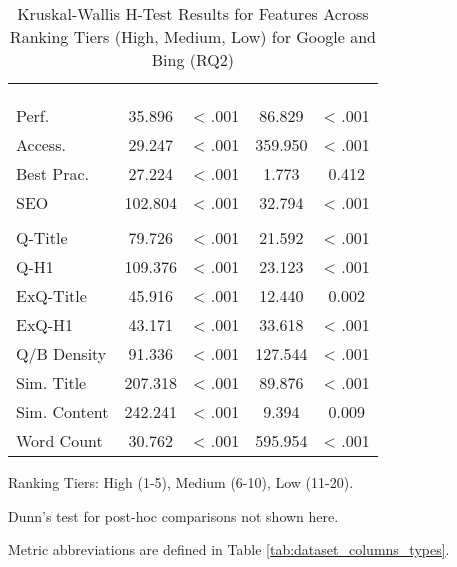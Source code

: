 \begin{table}[htbp!]
\centering
\caption{Kruskal-Wallis H-Test Results for Features Across Ranking Tiers (High, Medium, Low) for Google and Bing (RQ2)}
\label{tab:rq2_kruskal_wallis_ranks}
\small
\setlength{\tabcolsep}{3pt}
\renewcommand{\arraystretch}{1}
\begin{threeparttable}
\begin{tabular*}{\textwidth}{l@{\extracolsep{\fill}}S[table-format=3.3] S[table-format=1.3,table-comparator=true] S[table-format=3.3] S[table-format=1.3,table-comparator=true]}
\toprule
&  &  \\
\cmidrule(lr){2-3} \cmidrule(lr){4-5}
 & {} & {} & {} & {} \\
\dmidrule
{} & & & & \\
Perf. & 35.896 & < .001 & 86.829 & < .001 \\
Access. & 29.247 & < .001 & 359.950 & < .001 \\
Best Prac. & 27.224 & < .001 & 1.773 & 0.412 \\
SEO & 102.804 & < .001 & 32.794 & < .001 \\
\midrule
{} & & & & \\
Q-Title & 79.726 & < .001 & 21.592 & < .001 \\
Q-H1 & 109.376 & < .001 & 23.123 & < .001 \\
ExQ-Title & 45.916 & < .001 & 12.440 & 0.002 \\
ExQ-H1 & 43.171 & < .001 & 33.618 & < .001 \\
Q/B Density & 91.336 & < .001 & 127.544 & < .001 \\
Sim. Title & 207.318 & < .001 & 89.876 & < .001 \\
Sim. Content & 242.241 & < .001 & 9.394 & 0.009 \\
Word Count & 30.762 & < .001 & 595.954 & < .001 \\
\bottomrule
\end{tabular*}
\begin{tablenotes}[flushleft]
\scriptsize
\item Ranking Tiers: High (1-5), Medium (6-10), Low (11-20).
\item Dunn's test for post-hoc comparisons not shown here.
\item Metric abbreviations are defined in Table \ref{tab:dataset_columns_types}.
\end{tablenotes}
\end{threeparttable}
\end{table}
